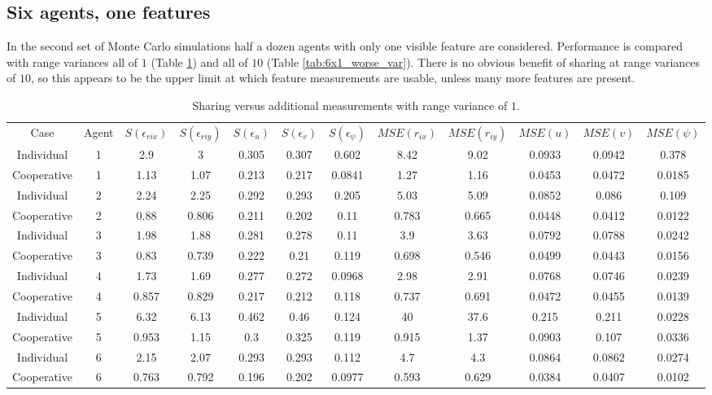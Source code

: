 \documentclass{aiaa-tc}
\begin{document}
\subsection{Six agents, one features}

In the second set of Monte Carlo simulations half a dozen agents with only one visible feature are considered. Performance is compared with range variances all of $1$ (Table \ref{tab:6x1}) and all of $10$ (Table \ref{tab:6x1_worse_var}). There is no obvious benefit of sharing at range variances of $10$, so this appears to be the upper limit at which feature measurements are usable, unless many more features are present.

\begin{table}[tb!]
\scriptsize
\centering
\begin{tabular}{c|c|c|c|c|c|c|c|c|c|c|c|}
Case & Agent & $S(\epsilon_{rix})$ & $S(\epsilon_{riy})$ & $S(\epsilon_{u})$ & $S(\epsilon_{v})$ & $S(\epsilon_{\psi})$ & $MSE(r_{ix})$ & $MSE(r_{iy})$ & $MSE(u)$ & $MSE(v)$ & $MSE(\psi)$ \\
Individual & 1& 2.9& 3& 0.305& 0.307& 0.602& 8.42& 9.02& 0.0933& 0.0942& 0.378 \\
Cooperative & 1& 1.13& 1.07& 0.213& 0.217& 0.0841& 1.27& 1.16& 0.0453& 0.0472& 0.0185 \\
Individual & 2& 2.24& 2.25& 0.292& 0.293& 0.205& 5.03& 5.09& 0.0852& 0.086& 0.109 \\
Cooperative & 2& 0.88& 0.806& 0.211& 0.202& 0.11& 0.783& 0.665& 0.0448& 0.0412& 0.0122 \\
Individual & 3& 1.98& 1.88& 0.281& 0.278& 0.11& 3.9& 3.63& 0.0792& 0.0788& 0.0242 \\
Cooperative & 3& 0.83& 0.739& 0.222& 0.21& 0.119& 0.698& 0.546& 0.0499& 0.0443& 0.0156 \\
Individual & 4& 1.73& 1.69& 0.277& 0.272& 0.0968& 2.98& 2.91& 0.0768& 0.0746& 0.0239 \\
Cooperative & 4& 0.857& 0.829& 0.217& 0.212& 0.118& 0.737& 0.691& 0.0472& 0.0455& 0.0139 \\
Individual & 5& 6.32& 6.13& 0.462& 0.46& 0.124& 40& 37.6& 0.215& 0.211& 0.0228 \\
Cooperative & 5& 0.953& 1.15& 0.3& 0.325& 0.119& 0.915& 1.37& 0.0903& 0.107& 0.0336 \\
Individual & 6& 2.15& 2.07& 0.293& 0.293& 0.112& 4.7& 4.3& 0.0864& 0.0862& 0.0274 \\
Cooperative & 6& 0.763& 0.792& 0.196& 0.202& 0.0977& 0.593& 0.629& 0.0384& 0.0407& 0.0102 \\
\end{tabular}
\caption{Sharing versus additional measurements with range variance of $1$.}
\label{tab:6x1}
\end{table}
\end{document}
